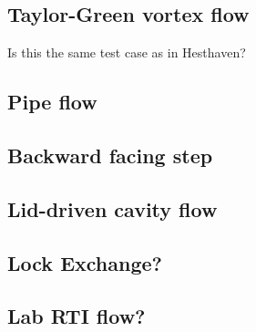 \subsection{Taylor-Green vortex flow}
Is this the same test case as in Hesthaven?

\subsection{Pipe flow}
\subsection{Backward facing step}
\subsection{Lid-driven cavity flow}
\subsection{Lock Exchange?}
\subsection{Lab RTI flow?}

